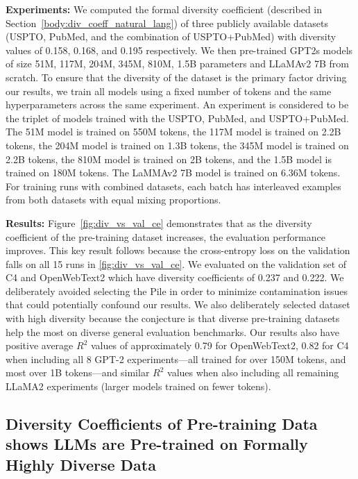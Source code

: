 \textbf{Experiments: } 
We computed the formal diversity coefficient (described in Section~\ref{body:div_coeff_natural_lang}) of three publicly available datasets (USPTO, PubMed, and the combination of USPTO+PubMed) with diversity values of 0.158, 0.168, and 0.195 respectively. 
We then pre-trained GPT2s \citep{gpt2} models of size 51M, 117M, 204M, 345M, 810M, 1.5B parameters and LLaMAv2 7B \citep{llamav2} from scratch. 
To ensure that the diversity of the dataset is the primary factor driving our results, we train all models using a fixed number of tokens and the same hyperparameters across the same experiment. 
An experiment is considered to be the triplet of models trained with the USPTO, PubMed, and USPTO+PubMed. 
The 51M model is trained on 550M tokens, the 117M model is trained on 2.2B tokens, the 204M model is trained on 1.3B tokens, the 345M model is trained on 2.2B tokens, the 810M model is trained on 2B tokens, and the 1.5B model is trained on 180M tokens. 
The LaMMAv2 7B model is trained on 6.36M tokens. 
For training runs with combined datasets, each batch has interleaved examples from both datasets with equal mixing proportions. 

\textbf{Results: }
Figure~\ref{fig:div_vs_val_ce} demonstrates that as the diversity coefficient of the pre-training dataset increases, the evaluation performance improves. 
This key result follows because the cross-entropy loss on the validation falls on all 15 runs in \ref{fig:div_vs_val_ce}. 
We evaluated on the validation set of C4 and OpenWebText2 which have diversity coefficients of 0.237 and 0.222. 
We deliberately avoided selecting the Pile in order to minimize contamination issues that could potentially confound our results. 
We also deliberately selected dataset with high diversity because the conjecture is that diverse pre-training datasets help the most on diverse general evaluation benchmarks. 
Our results also have positive average $R^2$ values of approximately 0.79 for OpenWebText2, 0.82 for C4 when including all 8 GPT-2 experiments---all trained for over 150M tokens, and most over 1B tokens---and similar $R^2$ values when also including all remaining LLaMA2 experiments (larger models trained on fewer tokens). 

\subsection{Diversity Coefficients of Pre-training Data shows LLMs are Pre-trained on Formally Highly Diverse Data}

